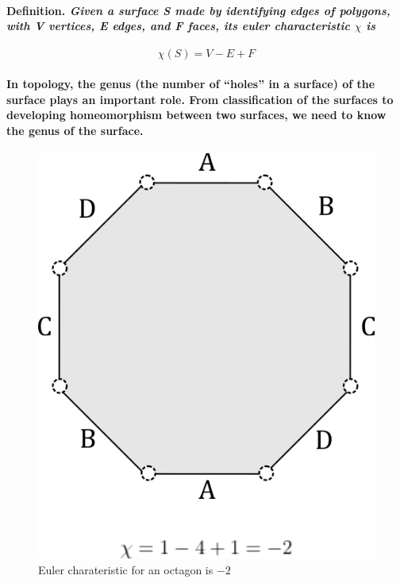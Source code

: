 \documentclass{report}
\begin{document}
\paragraph{\textbf{Definition.} \textit{Given a surface \textit{S} made by identifying edges of polygons, with \textit{V} vertices, \textit{E} edges, and \textit{F} faces, its euler characteristic $\chi$ is}}

\begin{equation}
\mathit{\chi(S)=V-E+F}
\end{equation}

\paragraph{In topology, the genus (the number of “holes” in a surface) of the surface plays an important role. From classification of the surfaces to developing homeomorphism between two surfaces, we need to know the genus of the surface.\\}

\begin{center}
\begin{figure}[h]
\includegraphics[scale=0.25]{euca}
\caption{Euler charateristic for an octagon is $-2$}
\end{figure}
\end{center}
\end{document}
